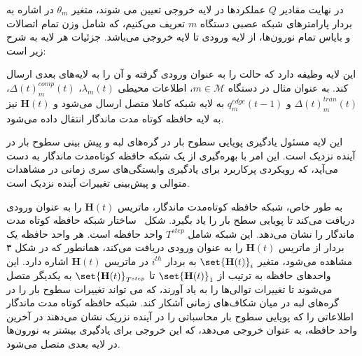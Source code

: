 در نهایت مقادیر $Q$ عملکردها در لایه خروجی تعیین می شوند، متغیر $\theta_m$ در اشاره به بردار پارامترهای شبکه عصبی دستگاه $m$ تعریف می‌کنیم، که شامل وزن تمام اتصالات و بایاس تمام نورون‌ها، از لایه ورودی تا لایه خروجی می‌باشد. جزئیات هر لایه به شرح زیر است:






این لایه وظیفه دارد که حالت را به عنوان ورودی گرفته و آن را به لایه‌های بعدی ارسال کند. به عنوان مثال در دستگاه $m \in \mathcal{M}$، اطلاعات محیطی $\lambda_m(t)$، $\Delta(t)_m^{comp}(t)$، $\Delta(t)_m^{tran}(t)$ و $q_m^{edge}(t-1)$ به لایه شبکه کاملا متصل ارسال می‌شود و $\textbf{H}(t)$ نیز به لایه حافظه کوتاه مدت ماندگار انتقال داده می‌شود.  


این لایه مسئول یادگیری پویایی سطوح بار در گره‌های لبه و پیش بینی سطوح بار در آینده نزدیک است. این امر با بهره‌گیری از یک شبکه حافظه کوتاه‌مدت ماندگار به دست می‌آید، که رویکردی پرکاربرد برای یادگیری وابستگی‌های سری زمانی در مشاهدات متوالی و پیش‌بینی تغییرات آینده نزدیک است. 

به طور خاص، شبکه حافظه کوتاه‌مدت ماندگار، ماتریس $\textbf{H}(t)$ را به عنوان ورودی دریافت می‌کند تا پویایی سطح بار را یاد بگیرد. شکل~ ساختار شبکه حافظه کوتاه مدت ماندگار را نشان می‌دهد. این شبکه شامل $T^{step}$ واحد حافظه است. هر واحد حافظه یک بردار از ماتریس $\textbf{H}(t)$ را به عنوان ورودی دریافت می‌کند، همانطور که در شکل ۳ مشاهده می‌شود، متغیر $\set{\textbf{H}(t)}_i$ به بردار $i^{th}$ در ماتریس $\textbf{H}(t)$ اشاره دارد. این واحدهای حافظه به ترتیب از $\set{\textbf{H}(t)}_1$ تا $\set{\textbf{H}(t)}_{T^{step}}$ به یکدیگر متصل می‌شوند تا تغییرات توالی‌ها را به یاد آورند، که می تواند تغییرات سطوح بار را در گره‌های لبه در میان شکاف‌های زمانی آشکار کند. شبکه حافظه کوتاه مدت ماندگار اطلاعاتی را که پویایی سطوح بار محاسباتی را در آینده نزریک نشان می‌دهند در آخرین واحد حافظه، به عنوان خروجی می‌دهد، که این خروجی برای یادگیری بیشتر به نورون‌ها در لایه بعدی متصل می‌شود.







